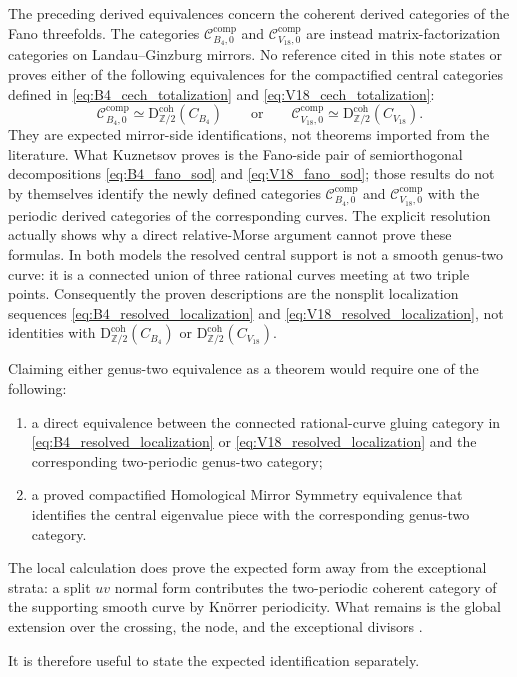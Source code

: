 \documentclass[11pt]{amsart}
\theoremstyle{definition}
\theoremstyle{remark}
\newcommand{\Dtwo}{\mathrm{D}^{\mathrm{coh}}_{\mathbb Z/2}}
\newcommand{\CcompB}{\mathcal C^{\mathrm{comp}}_{B_4,0}}
\newcommand{\CcompV}{\mathcal C^{\mathrm{comp}}_{V_{18},0}}
\begin{document}
The preceding derived equivalences concern the coherent derived categories of
the Fano threefolds.  The categories $\CcompB$ and $\CcompV$ are instead
matrix-factorization categories on Landau--Ginzburg mirrors.  No reference
cited in this note states or proves either of the following equivalences for
the compactified central categories defined in
\eqref{eq:B4_cech_totalization} and \eqref{eq:V18_cech_totalization}:
\[
\CcompB\simeq\Dtwo(C_{B_4})
\qquad\text{or}\qquad
\CcompV\simeq\Dtwo(C_{V_{18}}).
\]
They are expected mirror-side identifications, not theorems imported from the
literature.  What Kuznetsov proves is the Fano-side pair of semiorthogonal
decompositions \eqref{eq:B4_fano_sod} and \eqref{eq:V18_fano_sod}; those
results do not by themselves identify the newly defined categories $\CcompB$
and $\CcompV$ with the periodic derived categories of the corresponding
curves.
The explicit resolution actually shows why a direct relative-Morse argument
cannot prove these formulas.  In both models the resolved central support is
not a smooth genus-two curve: it is a connected union of three rational curves
meeting at two triple points.  Consequently the proven descriptions are the
nonsplit localization sequences
\eqref{eq:B4_resolved_localization} and
\eqref{eq:V18_resolved_localization}, not identities with
$\Dtwo(C_{B_4})$ or $\Dtwo(C_{V_{18}})$.

Claiming either genus-two equivalence as a theorem would require one of the
following:
\begin{enumerate}
\item a direct equivalence between the connected rational-curve gluing category
in \eqref{eq:B4_resolved_localization} or
\eqref{eq:V18_resolved_localization} and the corresponding two-periodic
genus-two category;
\item a proved compactified Homological Mirror Symmetry equivalence that
identifies the central eigenvalue piece with the corresponding genus-two
category.
\end{enumerate}

The local calculation does prove the expected form away from the exceptional
strata: a split $uv$ normal form contributes the two-periodic coherent category
of the supporting smooth curve by Knörrer periodicity.  What remains is the
global extension over the crossing, the node, and the exceptional divisors
\cite{Knorrer,OrlovEquivalences,Hirano,LuntsSchnurer}.

It is therefore useful to state the expected identification separately.
\end{document}
